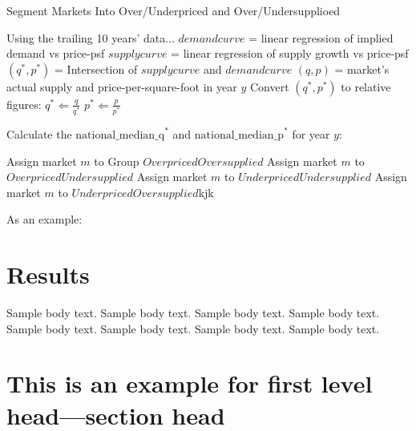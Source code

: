 \documentclass[sn-mathphys-num]{sn-jnl}%
\theoremstyle{thmstyleone}%
\theoremstyle{thmstyletwo}%
\theoremstyle{thmstylethree}%
\begin{document}
\begin{algorithm}
	\caption{Segment Markets Into Over/Underpriced and Over/Undersupplioed}\label{alg:market_segmentation}
	\begin{algorithmic}[1]
		\State Using the trailing 10 years' data...
		\State $demandcurve$ = linear regression of implied demand vs price-psf
		\State $supplycurve$ = linear regression of supply growth  vs price-psf
		\State $(q^*, p^*)$ = Intersection of $supplycurve$ and $demandcurve$
		\State $(q, p)$ = market's actual supply and price-per-square-foot in year $y$
		\State \hspace{4em} Convert $(q^*, p^*)$ to relative figures:
			\State \hspace{4em} $q^* \Leftarrow \frac{q}{q^*}$
			\State \hspace{4em} $p^* \Leftarrow \frac{p}{p^*}$
		\EndFor
		
		\State Calculate the $\text{national\_median\_q}^*$ and $\text{national\_median\_p}^*$ for year $y$:
		
		\State Assign market $m$ to Group $OverpricedOversupplied$
		\State Assign market $m$ to $OverpricedUndersupplied$
		\State Assign market $m$ to $UnderpricedUndersupplied$
		\State Assign market $m$ to $UnderpricedOversupplied$kjk
		\EndIf
		\EndFor
		\EndFor
	\end{algorithmic}
\end{algorithm}

As an example:




\section{Results}\label{sec2}

Sample body text. Sample body text. Sample body text. Sample body text. Sample body text. Sample body text. Sample body text. Sample body text.

\section{This is an example for first level head---section head}\label{sec3}
\end{document}

